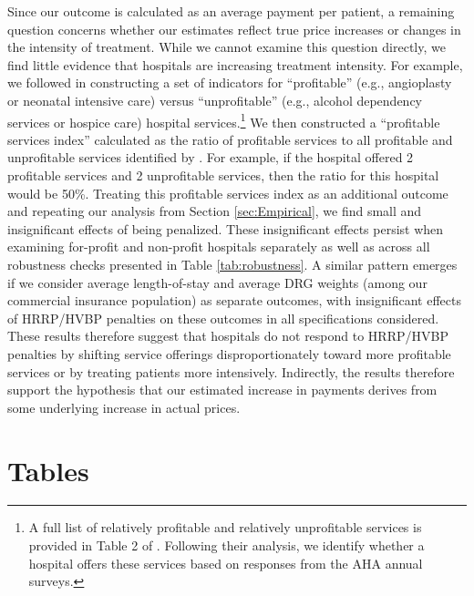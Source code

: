 \documentclass[12pt]{article}
\begin{document}
Since our outcome is calculated as an average payment per patient, a remaining question concerns whether our estimates reflect true price increases or changes in the intensity of treatment. While we cannot examine this question directly, we find little evidence that hospitals are increasing treatment intensity. For example, we followed \cite{horwitz2009} in constructing a set of indicators for ``profitable'' (e.g., angioplasty or neonatal intensive care) versus ``unprofitable'' (e.g., alcohol dependency services or hospice care) hospital services.\footnote{A full list of relatively profitable and relatively unprofitable services is provided in Table 2 of \cite{horwitz2009}. Following their analysis, we identify whether a hospital offers these services based on responses from the AHA annual surveys.} We then constructed a ``profitable services index'' calculated as the ratio of profitable services to all profitable and unprofitable services identified by \cite{horwitz2009}. For example, if the hospital offered 2 profitable services and 2 unprofitable services, then the ratio for this hospital would be 50\%. Treating this profitable services index as an additional outcome and repeating our analysis from Section \ref{sec:Empirical}, we find small and insignificant effects of being penalized. These insignificant effects persist when examining for-profit and non-profit hospitals separately as well as across all robustness checks presented in Table \ref{tab:robustness}. A similar pattern emerges if we consider average length-of-stay and average DRG weights (among our commercial insurance population) as separate outcomes, with insignificant effects of HRRP/HVBP penalties on these outcomes in all specifications considered. These results therefore suggest that hospitals do not respond to HRRP/HVBP penalties by shifting service offerings disproportionately toward more profitable services or by treating patients more intensively. Indirectly, the results therefore support the hypothesis that our estimated increase in payments derives from some underlying increase in actual prices.


\newpage




\clearpage
\newpage
\appendix
\section*{Tables}
\label{app:tables}
\end{document}
